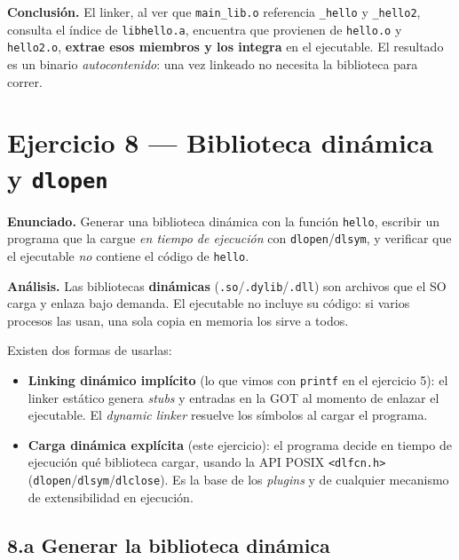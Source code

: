 \documentclass[11pt,a4paper]{article}
\begin{document}
\textbf{Conclusión.} El linker, al ver que \texttt{main\_lib.o}
referencia \texttt{\_hello} y \texttt{\_hello2}, consulta el índice
de \texttt{libhello.a}, encuentra que provienen de \texttt{hello.o} y
\texttt{hello2.o}, \textbf{extrae esos miembros y los integra} en el
ejecutable. El resultado es un binario \emph{autocontenido}: una vez
linkeado no necesita la biblioteca para correr.

\section{Ejercicio 8 --- Biblioteca dinámica y \texttt{dlopen}}

\textbf{Enunciado.} Generar una biblioteca dinámica con la función
\texttt{hello}, escribir un programa que la cargue \emph{en tiempo de
ejecución} con \texttt{dlopen}/\texttt{dlsym}, y verificar que el
ejecutable \emph{no} contiene el código de \texttt{hello}.

\textbf{Análisis.} Las bibliotecas \textbf{dinámicas}
(\texttt{.so}/\texttt{.dylib}/\texttt{.dll}) son archivos que el SO
carga y enlaza bajo demanda. El ejecutable no incluye su código: si
varios procesos las usan, una sola copia en memoria los sirve a todos.

Existen dos formas de usarlas:

\begin{itemize}[leftmargin=*]
    \item \textbf{Linking dinámico implícito} (lo que vimos con
        \texttt{printf} en el ejercicio 5): el linker estático genera
        \emph{stubs} y entradas en la GOT al momento de enlazar el
        ejecutable. El \emph{dynamic linker} resuelve los símbolos al
        cargar el programa.
    \item \textbf{Carga dinámica explícita} (este ejercicio): el
        programa decide en tiempo de ejecución qué biblioteca cargar,
        usando la API POSIX \texttt{<dlfcn.h>}
        (\texttt{dlopen}/\texttt{dlsym}/\texttt{dlclose}). Es la base
        de los \emph{plugins} y de cualquier mecanismo de
        extensibilidad en ejecución.
\end{itemize}

\subsection*{8.a Generar la biblioteca dinámica}
\end{document}

